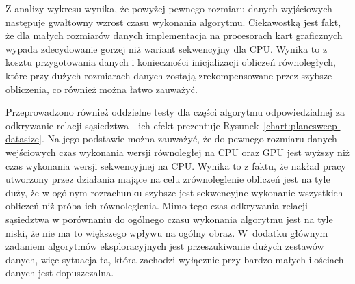 \documentclass[12pt]{article}
\begin{document}
Z analizy wykresu wynika, że powyżej pewnego rozmiaru danych wyjściowych następuje gwałtowny wzrost czasu wykonania algorytmu. Ciekawostką jest fakt, że dla małych rozmiarów danych implementacja na procesorach kart graficznych wypada zdecydowanie gorzej niż wariant sekwencyjny dla CPU. Wynika to z kosztu przygotowania danych i konieczności inicjalizacji obliczeń równoległych, które przy dużych rozmiarach danych zostają zrekompensowane przez szybsze obliczenia, co również można łatwo zauważyć.

Przeprowadzono również oddzielne testy dla części algorytmu odpowiedzialnej za odkrywanie relacji sąsiedztwa - ich efekt prezentuje Rysunek~\ref{chart:planesweep-datasize}. Na jego podstawie można zauważyć, że do pewnego rozmiaru danych wejściowych czas wykonania wersji równoległej na CPU oraz GPU jest wyższy niż czas wykonania wersji sekwencyjnej na CPU. Wynika to z faktu, że nakład pracy utworzony przez działania mające na celu zrównoleglenie obliczeń jest na tyle duży, że w ogólnym rozrachunku szybsze jest sekwencyjne wykonanie wszystkich obliczeń niż próba ich równoleglenia. Mimo tego czas odkrywania relacji sąsiedztwa w porównaniu do ogólnego czasu wykonania algorytmu jest na tyle niski, że nie ma to większego wpływu na ogólny obraz. W~dodatku głównym zadaniem algorytmów eksploracyjnych jest przeszukiwanie dużych zestawów danych, więc sytuacja ta, która zachodzi wyłącznie przy bardzo małych ilościach danych jest dopuszczalna.
\end{document}
